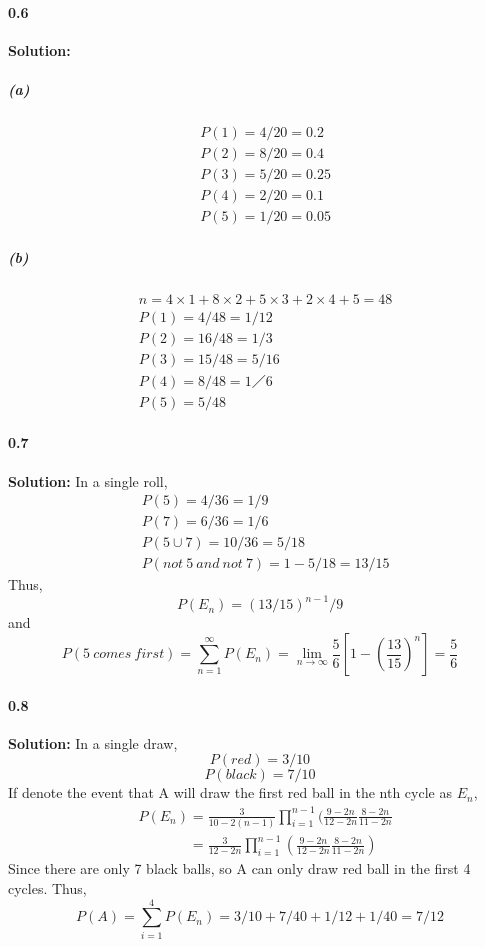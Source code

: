 \documentclass{article}[11pt]
\begin{document}
	\paragraph{0.6}\textbf{Solution:} 
		\subparagraph{(a)}
		\begin{align}
			&P(1) = 4/20 = 0.2\nonumber\\
			&P(2) = 8/20 = 0.4\nonumber\\
			&P(3) = 5/20 = 0.25\nonumber\\
			&P(4) = 2/20 = 0.1\nonumber\\
			&P(5) = 1/20 = 0.05\nonumber
		\end{align}
		\subparagraph{(b)}
		\begin{align}
			&n = 4 \times 1 + 8 \times 2 + 5 \times 3 + 2 \times 4 + 5 = 48\nonumber\\
			&P(1) = 4/48 = 1/12\nonumber\\
			&P(2) = 16/48 = 1/3\nonumber\\
			&P(3) = 15/48 = 5/16\nonumber\\
			&P(4) = 8/48 = 1／6\nonumber\\
			&P(5) = 5/48\nonumber
		\end{align}
	\paragraph{0.7}\textbf{Solution:} In a single roll, 
	\begin{align}
		&P(5) = 4/36 = 1/9\nonumber\\
		&P(7) = 6/36 = 1/6\nonumber\\
		&P(5 \cup 7) = 10/36 = 5/18\nonumber\\
		&P(not\ 5\ and\ not\ 7) = 1 - 5/18 = 13/15\nonumber
	\end{align}
		Thus,
			\[P(E_n) = (13/15)^{n-1}/9\]
		and
			\[P(5\ comes\ first) = \sum_{n=1}^\infty P(E_n) = \lim_{n\rightarrow \infty} \frac{5}{6}[1 - (\frac{13}{15})^{n}] = \frac{5}{6}\]
	\paragraph{0.8}\textbf{Solution: }In a single draw,
	    \[P(red) = 3/10\]
	    \[P(black) = 7/10\]
	    If denote the event that A will draw the first red ball in the nth cycle as $E_n$,
	    \begin{align}
	    &P(E_n) = \frac{3}{10 - 2(n-1)} \prod_{i = 1}^{n-1} (\frac{9 - 2n}{12 - 2n} \frac{8 - 2n}{11 - 2n} \nonumber\\
	    &\phantom{P(E_n)} = \frac{3}{12 - 2n} \prod_{i = 1}^{n-1} (\frac{9 - 2n}{12 - 2n} \frac{8 - 2n}{11 - 2n})\nonumber
	    \end{align}
	    Since there are only 7 black balls, so A can only draw red ball in the first 4 cycles. Thus,
	    \[P(A) = \sum_{i = 1}^4 P(E_n) = 3/10 + 7/40 + 1/12 + 1/40  = 7/12\]
\end{document}
